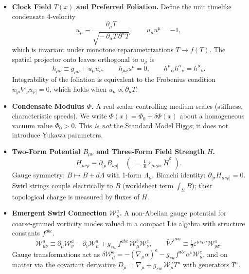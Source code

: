 \documentclass[smallextended]{svjour3}       %
\begin{document}
	\begin{itemize}
		\item \textbf{Clock Field \(T(x)\) and Preferred Foliation.}
		Define the unit timelike condensate 4-velocity
		\begin{equation}
			u_{\mu} \equiv \frac{\partial_{\mu}T}{\sqrt{-\,\partial_{\alpha}T\, \partial^{\alpha}T}},
			\qquad u_\mu u^\mu=-1,
		\end{equation}
		which is invariant under monotone reparametrizations \(T\!\to\! f(T)\).
		The spatial projector onto leaves orthogonal to \(u_\mu\) is
		\begin{equation}
			h_{\mu\nu} \equiv g_{\mu\nu}+u_\mu u_\nu, \qquad h_{\mu\nu}u^\nu=0, \qquad h^\mu{}_\alpha h^\alpha{}_\nu=h^\mu{}_\nu.
		\end{equation}
		Integrability of the foliation is equivalent to the Frobenius condition \(u_{[\mu}\nabla_{\nu}u_{\rho]}=0\), which holds when \(u_\mu\propto\partial_\mu T\).

		\item \textbf{Condensate Modulus \(\Phi\).}
		A real scalar controlling medium scales (stiffness, characteristic speeds). We write \(\Phi(x)=\Phi_0+\delta\Phi(x)\) about a homogeneous vacuum value \(\Phi_0>0\). This \emph{is not} the Standard Model Higgs; it does not introduce Yukawa parameters.

		\item \textbf{Two-Form Potential \(B_{\mu\nu}\) and Three-Form Field Strength \(H\).}
		\begin{equation}
			H_{\mu\nu\rho} \equiv \partial_{[\mu} B_{\nu\rho]} \quad (\;= \tfrac{1}{3!}\,\varepsilon_{\mu\nu\rho\sigma}\,\tilde H^{\sigma}\;).
		\end{equation}
		Gauge symmetry: \(B \mapsto B + d\Lambda\) with 1-form \(\Lambda_\mu\). Bianchi identity: \(\partial_{[\sigma}H_{\mu\nu\rho]}=0\).
		Swirl strings couple electrically to \(B\) (worldsheet term \(\int_\Sigma B\)); their topological charge is measured by fluxes of \(H\).

		\item \textbf{Emergent Swirl Connection \(\mathcal{W}_\mu^a\).}
		A non-Abelian gauge potential for coarse-grained vorticity modes valued in a compact Lie algebra with structure constants \(f^{abc}\).
		\begin{equation}
			\mathcal{W}_{\mu\nu}^a \equiv \partial_\mu \mathcal{W}_\nu^a - \partial_\nu \mathcal{W}_\mu^a + g_{\!sw}\, f^{abc}\,\mathcal{W}_\mu^b \mathcal{W}_\nu^c,
			\qquad \tilde{\mathcal{W}}^{\mu\nu a} \equiv \tfrac12 \varepsilon^{\mu\nu\rho\sigma}\mathcal{W}_{\rho\sigma}^a .
		\end{equation}
		Gauge transformations act as \(\delta \mathcal{W}_\mu^a = -(\nabla_\mu \alpha)^a - g_{\!sw} f^{abc}\alpha^b \mathcal{W}_\mu^c\),
		and on matter via the covariant derivative \(D_\mu=\nabla_\mu + g_{\!sw}\,\mathcal{W}_\mu^a T^a\) with generators \(T^a\).


\end{itemize}
\end{document}
